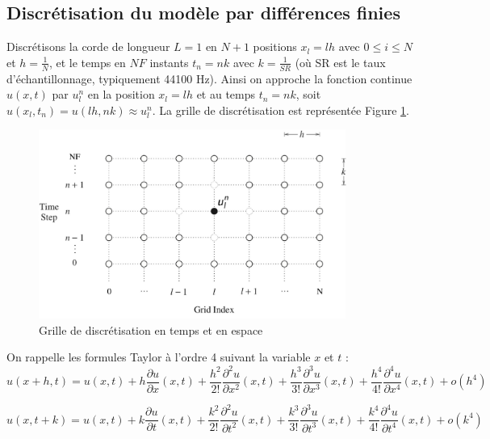 \documentclass[a4,12pt]{article}
\begin{document}
\subsection{Discrétisation du modèle par différences finies}

Discrétisons la corde de longueur $L=1$ en $N+1$ positions $x_l=lh$ avec $0\leqslant i\leqslant N$ et $h=\frac{1}{N}$, et le temps en $NF$ instants $t_n=nk$ avec $k=\frac{1}{SR}$ (où SR est le taux d'échantillonnage, typiquement 44100 Hz). Ainsi on approche la fonction continue $u(x,t)$ par $u_l^n$ en la position $x_l=lh$ et au temps $t_n=nk$, soit $u(x_l,t_n)=u(lh,nk)\approx u_l^n$. La grille de discrétisation est représentée Figure \ref{fig:grille}. \\

\begin{figure}
	\begin{center}
		\includegraphics[width=0.9\textwidth]{images/grille.pdf}
		\caption{Grille de discrétisation en temps et en espace }
		\label{fig:grille}
	\end{center}
\end{figure}

On rappelle les formules Taylor à l'ordre 4 suivant la variable $x$ et $t$ : 
\[
u(x+h,t)=u(x,t)+h\frac{\partial u}{\partial x}(x,t)+\frac{h^2}{2!}\frac{\partial^2 u}{\partial x^2}(x,t)+\frac{h^3}{3!}\frac{\partial^3 u}{\partial x^3}(x,t)+\frac{h^4}{4!}\frac{\partial^4 u}{\partial x^4}(x,t)+o(h^4)
\]

\[
u(x,t+k)=u(x,t)+k\frac{\partial u}{\partial t}(x,t)+\frac{k^2}{2!}\frac{\partial^2 u}{\partial t^2}(x,t)+\frac{k^3}{3!}\frac{\partial^3 u}{\partial t^3}(x,t)+\frac{k^4}{4!}\frac{\partial^4 u}{\partial t^4}(x,t)+o(k^4)
\]

\end{document}
